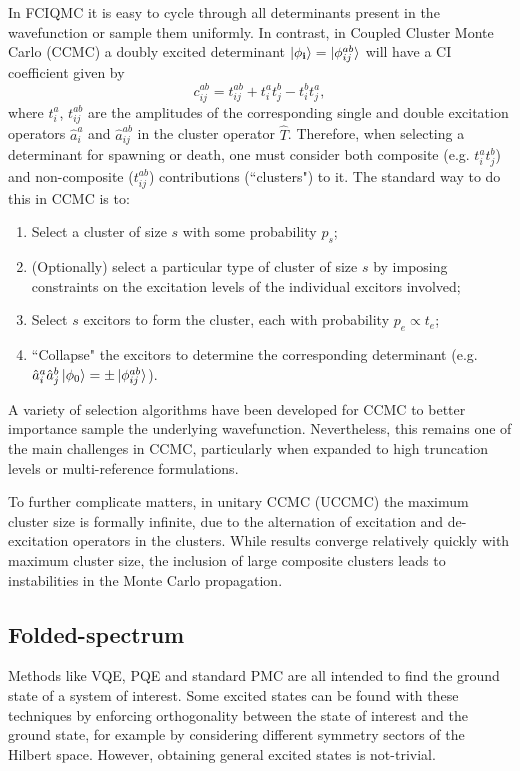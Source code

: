 \documentclass[%
 reprint,
 amsmath,amssymb,
 aps,
]{revtex4-2}
\begin{document}
In FCIQMC it is easy to cycle through all determinants present in the wavefunction or sample them uniformly. In contrast, in Coupled Cluster Monte Carlo (CCMC) a doubly excited determinant $\ket{\phi_\mathbf{i}} = \ket{\phi_{ij}^{ab}}$ will have a CI coefficient given by
\begin{equation}
    c_{ij}^{ab} = t_{ij}^{ab} + t_{i}^at_j^b - t_i^bt_j^a,
\end{equation}
where $t_{i}^a$, $t_{ij}^{ab}$ are the amplitudes of the corresponding single and double excitation operators $\hat a_i^a$ and $\hat a_{ij}^{ab}$ in the cluster operator $\hat T$. Therefore, when selecting a determinant for spawning or death, one must consider both composite (e.g. $t_{i}^at_j^b$) and non-composite ($t_{ij}^{ab}$) contributions (``clusters") to it. The standard way to do this in CCMC\cite{Thom2010, Scott2017} is to:
\begin{enumerate}
    \item Select a cluster of size $s$ with some probability $p_s$;
    \item (Optionally) select a particular type of cluster of size $s$ by imposing constraints on the excitation levels of the individual excitors involved;\cite{Scott2017}
    \item Select $s$ excitors to form the cluster, each with probability $p_e \propto t_e$;
    \item ``Collapse" the excitors to determine the corresponding determinant (e.g. $\hat a_i^a \hat a_j^b \ket{\phi_0} = \pm\ket{\phi_{ij}^{ab}}$).
\end{enumerate}

A variety of selection algorithms have been developed for CCMC  to better importance sample the underlying wavefunction.\cite{Scott2017} Nevertheless, this remains one of the main challenges in CCMC, particularly when expanded to high truncation levels\cite{Neufeld2017} or multi-reference formulations.\cite{Filip2019} 

To further complicate matters, in unitary CCMC (UCCMC)\cite{Filip2020} the maximum cluster size is formally infinite, due to the alternation of excitation and de-excitation operators in the clusters. While results converge relatively quickly with maximum cluster size, the inclusion of large composite clusters leads to instabilities in the Monte Carlo propagation.


\subsection{Folded-spectrum} 
Methods like VQE, PQE and standard PMC are all intended to find the ground state of a system of interest. Some excited states can be found with these techniques by enforcing orthogonality between the state of interest and the ground state, for example by considering different symmetry sectors of the Hilbert space.\cite{Nakanishi2019} However, obtaining general excited states is not-trivial.
\end{document}
